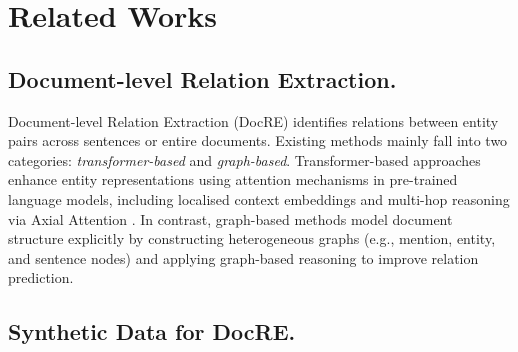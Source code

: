 \section{Related Works}
\subsection{Document-level Relation Extraction.}
\label{subsec:docre-models-related-works}
Document-level Relation Extraction (DocRE) identifies relations between entity pairs across sentences or entire documents. Existing methods mainly fall into two categories: \textit{transformer-based} and \textit{graph-based}. Transformer-based approaches \citep{zhou2021document, tan2022document, zhang2021document} enhance entity representations using attention mechanisms in pre-trained language models, including localised context embeddings \citep{zhang2021document} and multi-hop reasoning via Axial Attention \citep{tan2022document}. In contrast, graph-based methods \citep{christopoulou2019connecting, zeng2020double, xu2021document} model document structure explicitly by constructing heterogeneous graphs (e.g., mention, entity, and sentence nodes) and applying graph-based reasoning to improve relation prediction.

\subsection{Synthetic Data for DocRE.}

